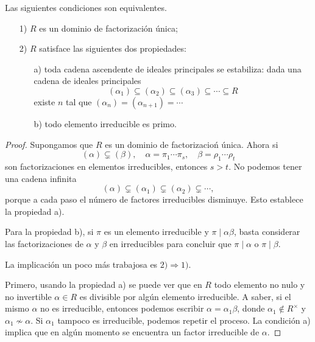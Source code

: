 \begin{teorema}
  \label{thm:caracterizacion-de-DFU}
  Las siguientes condiciones son equivalentes.

  \begin{enumerate}
  \item[1)] $R$ es un dominio de factorización única;

  \item[2)] $R$ satisface las siguientes dos propiedades:

    \begin{enumerate}
    \item[a)] toda cadena ascendente de ideales principales se estabiliza: dada
      una cadena de ideales principales
      \[ (\alpha_1) \subseteq (\alpha_2) \subseteq (\alpha_3)
             \subseteq \cdots \subseteq R \]
      existe $n$ tal que $(\alpha_n) = (\alpha_{n+1}) = \cdots$

    \item[b)] todo elemento irreducible es primo.
    \end{enumerate}
  \end{enumerate}

  \begin{proof}
    Supongamos que $R$ es un dominio de factorizacioń única. Ahora si
    \[ (\alpha) \subsetneq (\beta),
       \quad \alpha = \pi_1 \cdots \pi_s,
       \quad \beta = \rho_1 \cdots \rho_t \]
    son factorizaciones en elementos irreducibles, entonces $s > t$. No podemos
    tener una cadena infinita
    $$(\alpha) \subsetneq (\alpha_1) \subsetneq (\alpha_2) \subsetneq \cdots,$$
    porque a cada paso el número de factores irreducibles disminuye.
    Esto establece la propiedad a).

    Para la propiedad b), si $\pi$ es un elemento irreducible y
    $\pi\mid\alpha\beta$, basta considerar las factorizaciones de $\alpha$ y
    $\beta$ en irreducibles para concluir que $\pi\mid\alpha$ o $\pi\mid\beta$.

    \vspace{1em}

    La implicación un poco más trabajosa es $2) \Rightarrow 1)$.

    Primero, usando la propiedad a) se puede ver que en $R$ todo elemento
    no nulo y no invertible $\alpha \in R$ es divisible por algún elemento
    irreducible. A saber, si el mismo $\alpha$ no es irreducible, entonces
    podemos escribir $\alpha = \alpha_1 \beta$, donde $\alpha_1 \notin R^\times$
    y $\alpha_1 \not\sim \alpha$. Si $\alpha_1$ tampoco es irreducible, podemos
    repetir el proceso. La condición a) implica que en algún momento
    se encuentra un factor irreducible de $\alpha$.


\end{proof}
\end{teorema}
